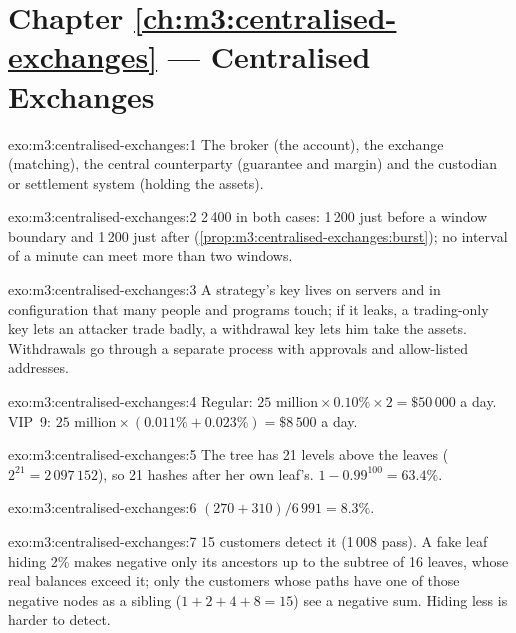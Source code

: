 \section*{Chapter \ref{ch:m3:centralised-exchanges} --- Centralised Exchanges}

\begin{solution}{exo:m3:centralised-exchanges:1}
The broker (the account), the exchange (matching), the central counterparty (guarantee and margin) and the
custodian or settlement system (holding the assets).
\end{solution}

\begin{solution}{exo:m3:centralised-exchanges:2}
2\,400 in both cases: 1\,200 just before a window boundary and 1\,200 just after
(\cref{prop:m3:centralised-exchanges:burst}); no interval of a minute can meet more than two windows.
\end{solution}

\begin{solution}{exo:m3:centralised-exchanges:3}
A strategy's key lives on servers and in configuration that many people and programs touch; if it leaks,
a trading-only key lets an attacker trade badly, a withdrawal key lets him take the assets. Withdrawals go
through a separate process with approvals and allow-listed addresses.
\end{solution}

\begin{solution}{exo:m3:centralised-exchanges:4}
Regular: $25\text{ million} \times 0.10\% \times 2 = \$50\,000$ a day. VIP~9: $25\text{ million} \times
(0.011\% + 0.023\%) = \$8\,500$ a day.
\end{solution}

\begin{solution}{exo:m3:centralised-exchanges:5}
The tree has 21 levels above the leaves ($2^{21} = 2\,097\,152$), so 21 hashes after her own leaf's.
$1 - 0.99^{100} = 63.4\%$.
\end{solution}

\begin{solution}{exo:m3:centralised-exchanges:6}
$(270 + 310)/6\,991 = 8.3\%$.
\end{solution}

\begin{solution}{exo:m3:centralised-exchanges:7}
15 customers detect it (1\,008 pass). A fake leaf hiding 2\% makes negative only its ancestors up to the
subtree of 16 leaves, whose real balances exceed it; only the customers whose paths have one of those
negative nodes as a sibling ($1 + 2 + 4 + 8 = 15$) see a negative sum. Hiding less is harder to detect.
\end{solution}


